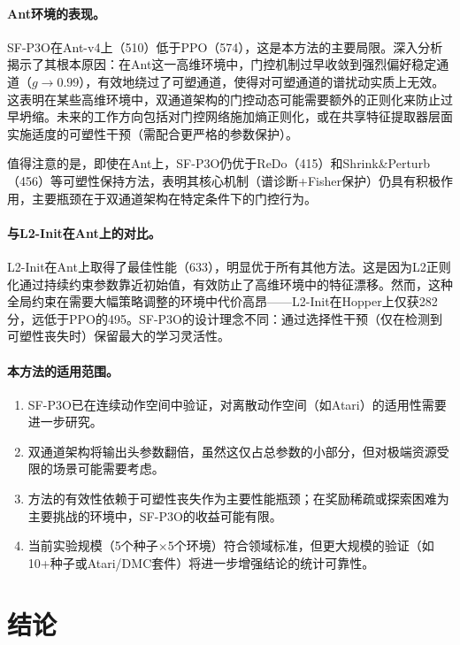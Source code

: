 \documentclass[twocolumn]{article}
\begin{document}
\paragraph{Ant环境的表现。}
SF-P3O在Ant-v4上（510）低于PPO（574），这是本方法的主要局限。深入分析揭示了其根本原因：在Ant这一高维环境中，门控机制过早收敛到强烈偏好稳定通道（$g \to 0.99$），有效地绕过了可塑通道，使得对可塑通道的谱扰动实质上无效。这表明在某些高维环境中，双通道架构的门控动态可能需要额外的正则化来防止过早坍缩。未来的工作方向包括对门控网络施加熵正则化，或在共享特征提取器层面实施适度的可塑性干预（需配合更严格的参数保护）。

值得注意的是，即使在Ant上，SF-P3O仍优于ReDo（415）和Shrink\&Perturb（456）等可塑性保持方法，表明其核心机制（谱诊断+Fisher保护）仍具有积极作用，主要瓶颈在于双通道架构在特定条件下的门控行为。

\paragraph{与L2-Init在Ant上的对比。}
L2-Init在Ant上取得了最佳性能（633），明显优于所有其他方法。这是因为L2正则化通过持续约束参数靠近初始值，有效防止了高维环境中的特征漂移。然而，这种全局约束在需要大幅策略调整的环境中代价高昂——L2-Init在Hopper上仅获282分，远低于PPO的495。SF-P3O的设计理念不同：通过选择性干预（仅在检测到可塑性丧失时）保留最大的学习灵活性。

\paragraph{本方法的适用范围。}
\begin{enumerate}[leftmargin=*]
    \item SF-P3O已在连续动作空间中验证，对离散动作空间（如Atari）的适用性需要进一步研究。
    \item 双通道架构将输出头参数翻倍，虽然这仅占总参数的小部分，但对极端资源受限的场景可能需要考虑。
    \item 方法的有效性依赖于可塑性丧失作为主要性能瓶颈；在奖励稀疏或探索困难为主要挑战的环境中，SF-P3O的收益可能有限。
    \item 当前实验规模（5个种子×5个环境）符合领域标准，但更大规模的验证（如10+种子或Atari/DMC套件）将进一步增强结论的统计可靠性。
\end{enumerate}


\section{结论}
\label{sec:conclusion}
\end{document}
